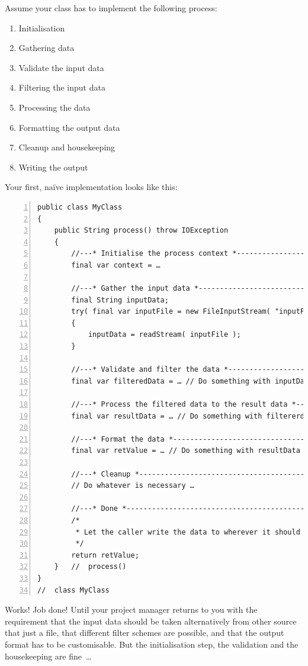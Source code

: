 \documentclass[11pt,a4paper, titlepage, parskip=half, headsepline, footsepline, cleardoublepage=current, headheight=1cm]{scrbook}
\begin{document}
Assume your class has to implement the following process:
\begin{enumerate}
\item{Initialisation}
\item{Gathering data}
\item{Validate the input data}
\item{Filtering the input data}
\item{Processing the data}
\item{Formatting the output data}
\item{Cleanup and housekeeping}
\item{Writing the output}
\end{enumerate}

Your first, naïve implementation looks like this:
\begin{lstlisting}[numbers=left]
public class MyClass
{
    public String process() throw IOException
    {
        //---* Initialise the process context *----------------------
        final var context = …
        
        //---* Gather the input data *-------------------------------
        final String inputData;
        try( final var inputFile = new FileInputStream( "inputFileName" ) )
        {
            inputData = readStream( inputFile );
        }
        
        //---* Validate and filter the data *------------------------
        final var filteredData = … // Do something with inputData
        
        //---* Process the filtered data to the result data *--------
        final var resultData = … // Do something with filtererdData
        
        //---* Format the data *-------------------------------------
        final var retValue = … // Do something with resultData
        
        //---* Cleanup *---------------------------------------------
        // Do whatever is necessary …
        
        //---* Done *------------------------------------------------
        /*
         * Let the caller write the data to wherever it should end up.
         */
        return retValue; 
    }   //  process()
}
//  class MyClass
\end{lstlisting}
Works! Job done! Until your project manager returns to you with the requirement that the input data should be taken alternatively from other source that just a file, that different filter schemes are possible, and that the output format has to be customisable. But the initialisation step, the validation and the housekeeping are fine~…
\end{document}
